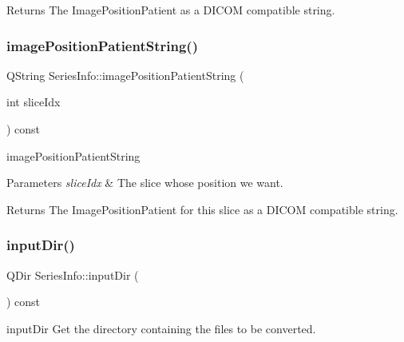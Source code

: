 \begin{DoxyReturn}{Returns}
The Image\+Position\+Patient as a D\+I\+C\+OM compatible string. 
\end{DoxyReturn}
\mbox{\label{class_series_info_ae1484c1360ac3b7590eb938d8d5489ce}} 
\subsubsection{\texorpdfstring{image\+Position\+Patient\+String()}{imagePositionPatientString()}\hspace{0.1cm}{\footnotesize\ttfamily [2/2]}}
{\footnotesize\ttfamily Q\+String Series\+Info\+::image\+Position\+Patient\+String (\begin{DoxyParamCaption}\item[{int}]{slice\+Idx }\end{DoxyParamCaption}) const}



image\+Position\+Patient\+String 


\begin{DoxyParams}{Parameters}
{\em slice\+Idx} & The slice whose position we want. \\
\hline
\end{DoxyParams}
\begin{DoxyReturn}{Returns}
The Image\+Position\+Patient for this slice as a D\+I\+C\+OM compatible string. 
\end{DoxyReturn}
\mbox{\label{class_series_info_ab30b8c01a3413b913f00203b2ef5a117}} 
\subsubsection{\texorpdfstring{input\+Dir()}{inputDir()}}
{\footnotesize\ttfamily Q\+Dir Series\+Info\+::input\+Dir (\begin{DoxyParamCaption}{ }\end{DoxyParamCaption}) const\hspace{0.3cm}{\ttfamily [inline]}}



input\+Dir Get the directory containing the files to be converted. 

